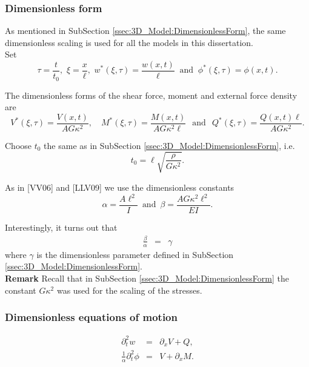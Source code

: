 \documentclass[../../main.tex]{subfiles}
\begin{document}
    \subsubsection*{Dimensionless form}\label{sssec:1D_Model:DimensionlessForm}
    As mentioned in SubSection \ref{ssec:3D_Model:DimensionlessForm}, the same dimensionless scaling is used for all the models in this dissertation.\\

    Set \[\tau = \frac{t}{t_0}, \,\, \xi = \frac{x}{\ell}, \,\, w^*(\xi,\tau) = \frac{w(x,t)}{\ell} \ \text{ and } \ \phi^*(\xi, \tau) = \phi(x,t).\]

    The dimensionless forms of the shear force, moment and external force density are \[ V^{*}(\xi,\tau) = \frac{V(x,t)}{AG\kappa^2}, \quad M^{*}(\xi,\tau) = \frac{M(x,t)}{A G\kappa^2 \ell} \,\,\, \ \text{and} \ \,\,\, Q^*(\xi,\tau) = \frac{Q(x,t)\ell}{A G\kappa^2}.\]

    Choose $t_0$ the same as in SubSection \ref{ssec:3D_Model:DimensionlessForm}, i.e. \[t_0 = \ell\sqrt{\frac{\rho}{G\kappa^2}}.\]

    As in [VV06] and [LLV09] we use the dimensionless constants
    \begin{equation*}
        \alpha = \frac{A \ell^2}{I} \,\,\, \text{and} \,\,\, \beta
        =\frac{AG\kappa^2 \ell^2}{EI}.
    \end{equation*}\label{sym:alphabeta}

    Interestingly, it turns out that
    \begin{eqnarray*}
        \frac{\beta}{\alpha} & = & \gamma
    \end{eqnarray*} where $\gamma$ is the dimensionless parameter defined in SubSection \ref{ssec:3D_Model:DimensionlessForm}.\\

    \textbf{Remark} Recall that in SubSection \ref{ssec:3D_Model:DimensionlessForm} the constant $G\kappa^2$ was used for the scaling of the stresses.

    \subsubsection*{Dimensionless equations of motion}\label{sssec:1D_Model:DimensionlessEquationsOfMotion}
    \begin{eqnarray}
        \partial_{t}^{2} w &=& \partial_{x}V + Q, \label{eq:1D_Model:EquationOfMotion1D}\\
        \frac{1}{\alpha} \partial_{t}^{2} \phi &=& V + \partial_{x}M.\label{eq:1D_Model:EquationOfMotion2D}
    \end{eqnarray}
\end{document}
